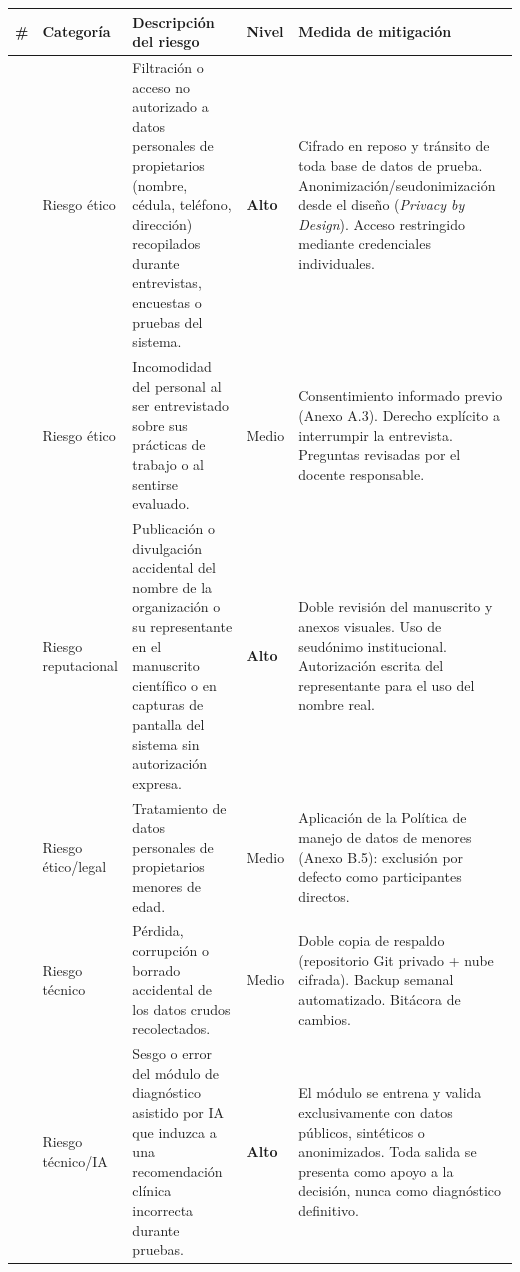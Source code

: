 \documentclass[
]{article}
\newcounter{none} %
\begin{document}
{\def\LTcaptype{none} %
\begin{longtable}[]{|
  >{\raggedright\arraybackslash}p{}|
  >{\raggedright\arraybackslash}p{}|
  >{\raggedright\arraybackslash}p{}|
  >{\centering\arraybackslash}p{}|
  >{\raggedright\arraybackslash}p{}|}
\hline
\textbf{\#} & \textbf{Categoría} & \textbf{Descripción del riesgo} & \textbf{Nivel} & \textbf{Medida de mitigación} \\
\hline
\endhead
\hline
\endlastfoot
1 & Riesgo ético & Filtración o acceso no autorizado a datos personales de propietarios (nombre, cédula, teléfono, dirección) recopilados durante entrevistas, encuestas o pruebas del sistema. & \textbf{Alto} & Cifrado en reposo y tránsito de toda base de datos de prueba. Anonimización/seudonimización desde el diseño (\emph{Privacy by Design}). Acceso restringido mediante credenciales individuales. \\
\hline
2 & Riesgo ético & Incomodidad del personal al ser entrevistado sobre sus prácticas de trabajo o al sentirse evaluado. & Medio & Consentimiento informado previo (Anexo A.3). Derecho explícito a interrumpir la entrevista. Preguntas revisadas por el docente responsable. \\
\hline
3 & Riesgo reputacional & Publicación o divulgación accidental del nombre de la organización o su representante en el manuscrito científico o en capturas de pantalla del sistema sin autorización expresa. & \textbf{Alto} & Doble revisión del manuscrito y anexos visuales. Uso de seudónimo institucional. Autorización escrita del representante para el uso del nombre real. \\
\hline
4 & Riesgo ético/legal & Tratamiento de datos personales de propietarios menores de edad. & Medio & Aplicación de la Política de manejo de datos de menores (Anexo B.5): exclusión por defecto como participantes directos. \\
\hline
5 & Riesgo técnico & Pérdida, corrupción o borrado accidental de los datos crudos recolectados. & Medio & Doble copia de respaldo (repositorio Git privado + nube cifrada). Backup semanal automatizado. Bitácora de cambios. \\
\hline
6 & Riesgo técnico/IA & Sesgo o error del módulo de diagnóstico asistido por IA que induzca a una recomendación clínica incorrecta durante pruebas. & \textbf{Alto} & El módulo se entrena y valida exclusivamente con datos públicos, sintéticos o anonimizados. Toda salida se presenta como apoyo a la decisión, nunca como diagnóstico definitivo. \\

\end{longtable}}
\end{document}

